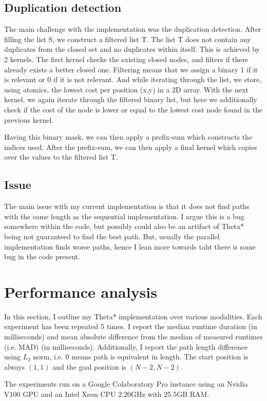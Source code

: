 \documentclass{article}
\begin{document}
\subsection{Duplication detection}
%
The main challenge with the implementation was the duplication detection. After filling the list S, we construct a filtered list T. The list T does not contain any duplicates from the closed set and no duplicates within itself. This is achieved by 2 kernels. The first kernel checks the existing closed nodes, and filters if there already exists a better closed one. Filtering means that we assign a binary 1 if it is relevant or 0 if it is not relevant. And while iterating through the list, we store, using atomics, the lowest cost per position (x,y) in a 2D array. With the next kernel, we again iterate through the filtered binary list, but here we additionally check if the cost of the node is lower or equal to the lowest cost node found in the previous kernel.

Having this binary mask, we can then apply a prefix-sum which constructs the indices used. After the prefix-sum, we can then apply a final kernel which copies over the values to the filtered list T.
%
\subsection{Issue}
%
The main issue with my current implementation is that it does not find paths with the same length as the sequential implementation. I argue this is a bug somewhere within the code, but possibly could also be an artifact of Theta* being not guaranteed to find the best path. But, usually the parallel implementation finds worse paths, hence I lean more towards taht there is some bug in the code present.
%
\section{Performance analysis}
%
In this section, I outline my Theta* implementation over various modalities. Each experiment has been repeated 5 times. I report the median runtime duration (in milliseconds) and mean absolute difference from the median of measured runtimes (i.e. MAD) (in milliseconds). Additionally, I report the path length difference using $L_2$ norm, i.e. 0 means path is equivalent in length. The start position is always $(1,1)$ and the goal position is $(N-2,N-2)$.

The experiments run on a Google Colaboratory Pro instance using an Nvidia V100 GPU and an Intel Xeon CPU 2.20GHz with 25.5GB RAM.
\end{document}
